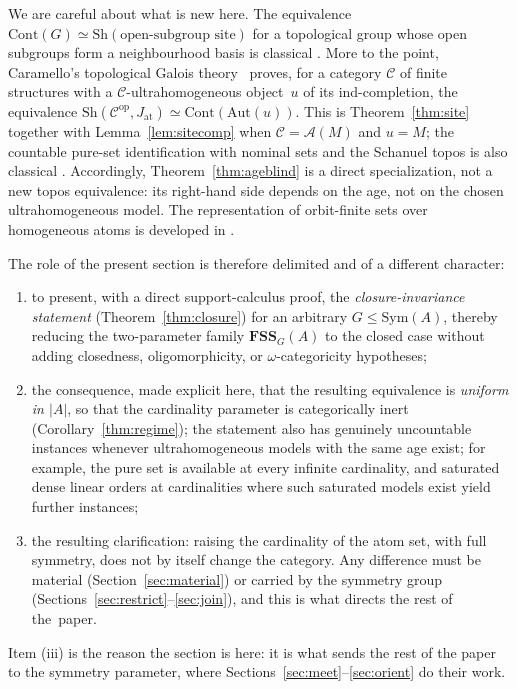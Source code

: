 \documentclass{lmcs}
\newcommand{\Sym}{\mathrm{Sym}}
\newcommand{\Aut}{\mathrm{Aut}}
\newcommand{\FSS}{\mathbf{FSS}}
\begin{document}
\begin{rem}[Attribution]\label{rem:knownness}
We are careful about what is new here. The equivalence
$\mathrm{Cont}(G)\simeq\mathrm{Sh}(\text{open-subgroup site})$ for a
topological group whose open subgroups form a neighbourhood basis is
classical \cite{MacLaneMoerdijk}. More to the point, Caramello's
topological Galois theory~\cite{Caramello16} proves, for a category
$\mathcal C$ of finite structures with a
$\mathcal C$-ultrahomogeneous object~$u$ of its ind-completion, the
equivalence
$\mathrm{Sh}(\mathcal C^{\mathrm{op}},J_{\mathrm{at}})\simeq
\mathrm{Cont}(\Aut(u))$. This is Theorem~\ref{thm:site} together with
Lemma~\ref{lem:sitecomp} when $\mathcal C=\mathcal A(M)$ and $u=M$;
the countable pure-set identification with nominal sets and the
Schanuel topos is also classical \cite{Johnstone02,Pitts13}.
Accordingly, Theorem~\ref{thm:ageblind} is a direct specialization,
not a new topos equivalence: its right-hand side depends on the age,
not on the chosen ultrahomogeneous model. The representation of
orbit-finite sets over homogeneous atoms is developed in \cite{BKL14}.

\noindent
The role of the present section is therefore delimited and of a different character:
\begin{enumerate}[label=\textup{(\roman*)},leftmargin=2.4em]
\item to present, with a direct support-calculus proof, the \emph{closure-invariance statement} (Theorem~\ref{thm:closure}) for an arbitrary $G\leq\Sym(A)$, thereby reducing the two-parameter family $\FSS_G(A)$ to the closed case without adding closedness, oligomorphicity, or $\omega$-categoricity hypotheses;
\item the consequence, made explicit here, that the resulting equivalence is \emph{uniform in $|A|$}, so that the cardinality parameter is categorically inert (Corollary~\ref{thm:regime}); the statement also has genuinely uncountable instances whenever ultrahomogeneous models with the same age exist; for example, the pure set is available at every infinite cardinality, and saturated dense linear orders at cardinalities where such saturated models exist yield further instances;
\item the resulting clarification: raising the cardinality of the atom set, with full symmetry, does not by itself change the category. Any difference must be material (Section~\ref{sec:material}) or carried by the symmetry group (Sections~\ref{sec:restrict}--\ref{sec:join}), and this is what directs the rest of the~paper.
\end{enumerate}
Item (iii) is the reason the section is here: it is what sends the rest of the paper to the symmetry parameter, where Sections~\ref{sec:meet}--\ref{sec:orient} do their work.
\end{rem}
\end{document}
